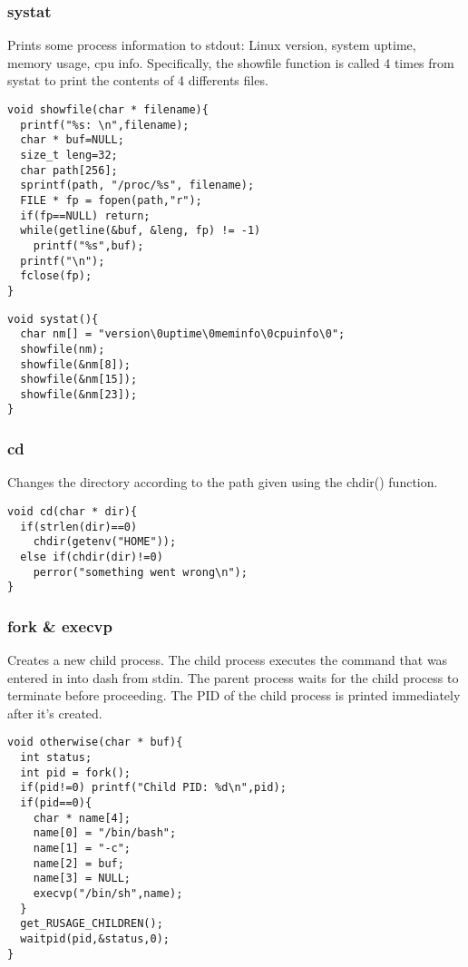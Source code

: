 \documentclass[12pt]{article}
\begin{document}
\noindent \subsubsection*{systat} \par
Prints some process information to stdout: Linux version, 
system uptime, memory usage, cpu info. Specifically, the {\ttfamily showfile} function is called 4 times from {\ttfamily systat} to print the contents of 4 differents files. 
\begin{verbatim}
void showfile(char * filename){
  printf("%s: \n",filename);
  char * buf=NULL;
  size_t leng=32;
  char path[256];
  sprintf(path, "/proc/%s", filename);
  FILE * fp = fopen(path,"r");
  if(fp==NULL) return;
  while(getline(&buf, &leng, fp) != -1)
    printf("%s",buf);
  printf("\n");
  fclose(fp);
}
\end{verbatim}
\newpage
\begin{verbatim}
void systat(){
  char nm[] = "version\0uptime\0meminfo\0cpuinfo\0";
  showfile(nm);
  showfile(&nm[8]);
  showfile(&nm[15]);
  showfile(&nm[23]);
}
\end{verbatim}

\noindent \subsubsection*{cd} \par
Changes the directory according to the path given using the chdir() function.
\begin{verbatim}
void cd(char * dir){
  if(strlen(dir)==0)
    chdir(getenv("HOME"));
  else if(chdir(dir)!=0) 
    perror("something went wrong\n");
}
\end{verbatim}

\noindent \subsubsection*{fork \& execvp} \par
Creates a new child process. The child process executes the command that 
was entered in into {\ttfamily dash} from {\ttfamily stdin}. The parent process waits for the child process to terminate before proceeding. The PID of the child process is printed immediately after it's created. 
\begin{verbatim}
void otherwise(char * buf){
  int status;
  int pid = fork();
  if(pid!=0) printf("Child PID: %d\n",pid);
  if(pid==0){
    char * name[4];
    name[0] = "/bin/bash";
    name[1] = "-c";
    name[2] = buf;
    name[3] = NULL;
    execvp("/bin/sh",name);
  }
  get_RUSAGE_CHILDREN();
  waitpid(pid,&status,0);
}
\end{verbatim}
\newpage
\end{document}
